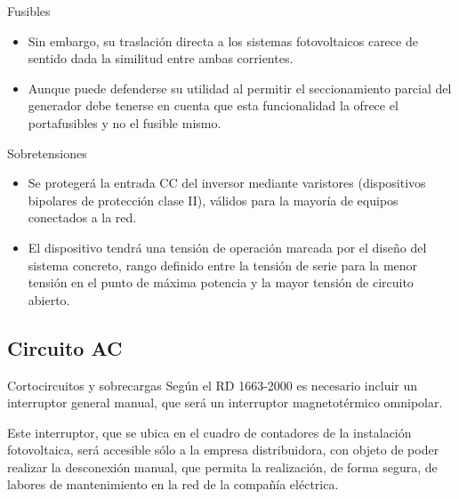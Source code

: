 \documentclass[xcolor={usenames,svgnames,dvipsnames}]{beamer}
\begin{document}
\begin{frame}[label=sec-5-1-8]{Fusibles}
\begin{itemize}
\item Sin embargo, su traslación directa a los sistemas fotovoltaicos
carece de sentido dada la similitud entre ambas corrientes.

\item Aunque puede defenderse su utilidad al permitir el seccionamiento
parcial del generador debe tenerse en cuenta que esta funcionalidad
la ofrece el portafusibles y no el fusible mismo.
\end{itemize}
\end{frame}

\begin{frame}[label=sec-5-1-9]{Sobretensiones}
\begin{itemize}
\item Se protegerá la entrada CC del inversor mediante \alert{varistores}
(dispositivos bipolares de protección clase II), válidos para la
mayoría de equipos conectados a la red.

\item El dispositivo tendrá una tensión de operación marcada por el diseño
del sistema concreto, rango definido entre la tensión de serie para
la menor tensión en el punto de máxima potencia y la mayor tensión de
circuito abierto.
\end{itemize}
\end{frame}

\subsection{Circuito AC}
\label{sec-5-2}

\begin{frame}[label=sec-5-2-1]{Cortocircuitos y sobrecargas}
Según el RD 1663-2000 es necesario incluir un \alert{interruptor general
manual}, que será un interruptor magnetotérmico omnipolar.

Este interruptor, que se ubica en el cuadro de contadores de la
instalación fotovoltaica, será \alert{accesible sólo a la empresa
distribuidora}, con objeto de poder realizar la desconexión manual, que
permita la realización, de forma segura, de labores de mantenimiento en
la red de la compañía eléctrica.
\end{frame}
\end{document}
